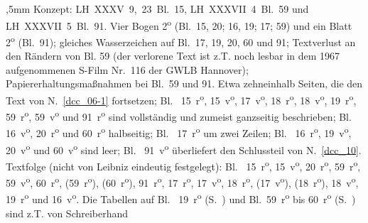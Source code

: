 \begin{ledgroupsized}[r]{114mm}%
\footnotesize
\pstart%
,5mm%
%
Konzept:
LH~XXXV~9,~23~Bl.~15,
LH~XXXVII~4~Bl.~59 und
LH~XXXVII~5~Bl.~91. 
Vier Bogen 2\textsuperscript{o}
(Bl.~15, 20; 16, 19; 17; 59)
und ein Blatt 2\textsuperscript{o}
(Bl.~91);
gleiches Wasserzeichen auf Bl.~17, 19, 20, 60 und 91;
Textverlust an den Rändern von Bl. 59
(der verlorene Text ist z.T. noch lesbar in dem 1967 aufgenommenen S-Film Nr.~116 der GWLB Hannover);
Papiererhaltungsmaßnahmen bei Bl.~59 und 91.
%
Etwa zehneinhalb Seiten, %
die den Text von N.~\ref{dcc_06-1} %
fortsetzen;
Bl.~%
15~r\textsuperscript{o}, %
15~v\textsuperscript{o}, %
17~v\textsuperscript{o}, %
18~r\textsuperscript{o}, %
18~v\textsuperscript{o}, %
19~r\textsuperscript{o}, %
59~r\textsuperscript{o}, %
59~v\textsuperscript{o} und %
91~r\textsuperscript{o} %
sind vollständig und zumeist ganzseitig beschrieben;
Bl.~%
16~v\textsuperscript{o}, %
20~r\textsuperscript{o} und %
60~r\textsuperscript{o} %
halbseitig;
Bl.~%
17~r\textsuperscript{o}
um zwei Zeilen; %
Bl.~%
16~r\textsuperscript{o}, %
19~v\textsuperscript{o}, %
20~v\textsuperscript{o} und %
60~v\textsuperscript{o} %
sind leer;
Bl.~%
91~v\textsuperscript{o}
überliefert den Schlussteil von N.~\ref{dcc_10}. %
%
Textfolge (nicht von Leibniz eindeutig festgelegt):
Bl.~%
15~r\textsuperscript{o},
15~v\textsuperscript{o},
20~r\textsuperscript{o},
59~r\textsuperscript{o},
59~v\textsuperscript{o},
60~r\textsuperscript{o},
(59~r\textsuperscript{o}),
(60~r\textsuperscript{o}),
91~r\textsuperscript{o},
17~r\textsuperscript{o},
17~v\textsuperscript{o},
18~r\textsuperscript{o},
(17~v\textsuperscript{o}),
(18~r\textsuperscript{o}),
18~v\textsuperscript{o}, %
19~r\textsuperscript{o} und
16~v\textsuperscript{o}.
Die Tabellen auf Bl.~%
19~r\textsuperscript{o} (S.~\pageref{LH_35_09_23_019r_tab3}) und
Bl.~59~r\textsuperscript{o} bis
60~r\textsuperscript{o} (S.~\pageref{LH_37_04_059r_tabelle1in16}\textendash\pageref{LH_37_04_060r_tabelle1in1})
sind z.T. von Schreiberhand

\end{ledgroupsized}

